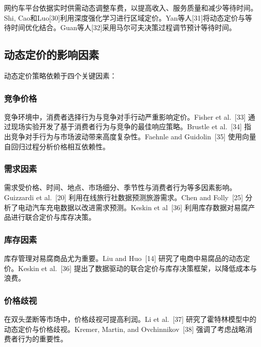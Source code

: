 网约车平台依据实时供需动态调整车费，以提高收入、服务质量和减少等待时间。Shi, Cao和Luo[30]利用深度强化学习进行区域定价。Yan等人[31]将动态定价与等待时间优化结合。Guan等人[32]采用马尔可夫决策过程调节预计等待时间。

\subsection{动态定价的影响因素}\label{vi.-factors-of-dynamic-pricing}

动态定价策略依赖于四个关键因素：

\subsubsection{竞争价格}\label{a.-competition-price}

竞争环境中，消费者选择行为与竞争对手行动严重影响定价。Fisher et al.~[33] 通过现场实验开发了基于消费者行为与竞争的最佳响应策略。Brustle et al.~[34] 指出竞争对手行为与市场波动带来高度复杂性。Faehnle and Guidolin~[35] 使用向量自回归过程分析价格相互依赖性。

\subsubsection{需求因素}\label{b.-the-demand-factor}

需求受价格、时间、地点、市场细分、季节性与消费者行为等多因素影响。Guizzardi et al.~[20] 利用在线旅行社数据预测旅游需求。Chen and Folly~[25] 分析了电动汽车充电数据以改进需求预测。Keskin et al~[36] 利用库存数据对易腐产品进行联合定价与库存决策。

\subsubsection{库存因素}\label{c.-the-inventory-factor}

库存管理对易腐商品尤为重要。Liu and Huo~[14] 研究了电商中易腐品的动态定价。Keskin et al.~[36] 提出了数据驱动的联合定价与库存决策框架，以降低成本与浪费。

\subsubsection{价格歧视}\label{d.-price-discrimination}

在双头垄断等市场中，价格歧视可提高利润。Li et al.~[37] 研究了霍特林模型中的动态定价与价格歧视。Kremer, Martin, and Ovchinnikov~[38] 强调了考虑战略消费者行为的重要性。

